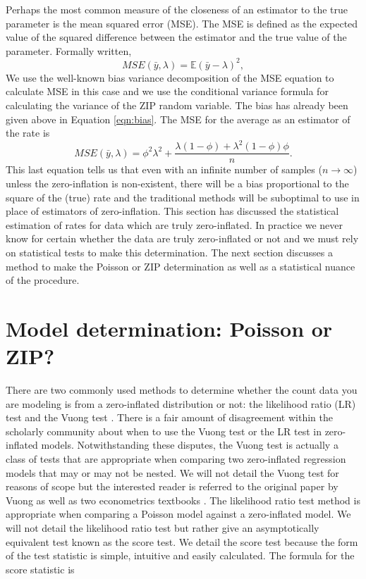 \documentclass{article}
\begin{document}
Perhaps the most common measure of the closeness of an estimator to the true parameter is the mean squared error (MSE). The MSE is defined as the expected value of the squared difference between the estimator and the true value of the parameter. Formally written, 
\begin{equation}
MSE(\bar{y}, \lambda) = \mathbb{E}(\bar{y}-\lambda)^2,
\end{equation}
We use the well-known bias variance decomposition of the MSE equation to calculate MSE in this case and we use the conditional variance formula for calculating the variance of the ZIP random variable. The bias has already been given above in Equation \ref{eqn:bias}. The MSE for the average as an estimator of the rate is 
\begin{equation}
MSE(\bar{y}, \lambda) = \phi^2\lambda^2 + \frac{ \lambda(1-\phi) +\lambda^2(1-\phi)\phi}{n}.
\end{equation}
This last equation tells us that even with an infinite number of samples ($n \to \infty$) unless the zero-inflation is non-existent, there will be a bias proportional to the square of the (true) rate and the traditional methods will be suboptimal to use in place of estimators of zero-inflation. This section has discussed the statistical estimation of rates for data which are truly zero-inflated. In practice we never know for certain whether the data are truly zero-inflated or not and we must rely on statistical tests to make this determination. The next section discusses a method to make the Poisson or ZIP determination as well as a statistical nuance of the procedure.
 
\section{Model determination: Poisson or ZIP?}\label{sec:model_det}

There are two commonly used methods to determine whether the count data you are modeling is from a zero-inflated distribution or not: the likelihood ratio (LR) test and the Vuong test \cite{vuong1989likelihood}.  
There is a fair amount of disagreement within the scholarly community about when to use the Vuong test or the LR test \cite{wilson2015misuse} in zero-inflated models. Notwithstanding these disputes, the Vuong test is actually a class of tests that are appropriate when comparing two zero-inflated regression models that may or may not be nested. We will not detail the Vuong test for reasons of scope but the interested reader is referred to the original paper by Vuong as well as two econometrics textbooks \cite{2005estimation,davidson1995estimation}. The likelihood ratio test method is appropriate when comparing a Poisson model against a zero-inflated model. We will not detail the likelihood ratio test but rather give an asymptotically equivalent test known as the score test. We detail the score test because the form of the test statistic is simple, intuitive and easily calculated. The formula for the score statistic is
\end{document}
